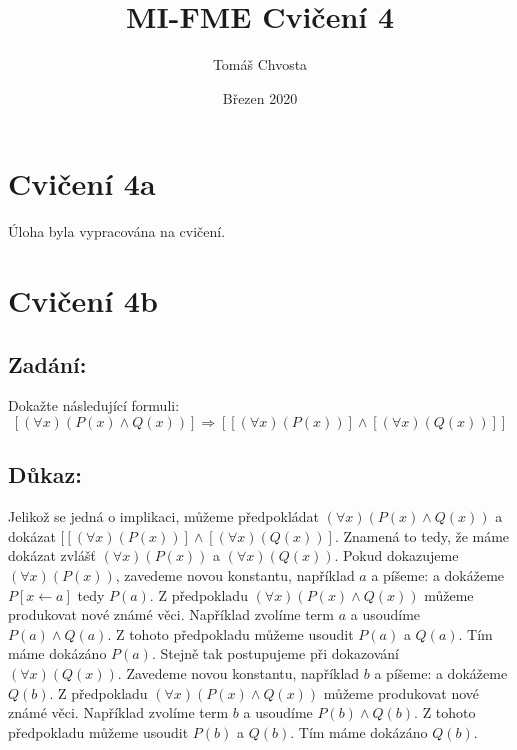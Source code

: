 \documentclass{article}
\title{MI-FME Cvičení 4}
\author{Tomáš Chvosta}
\date{Březen 2020}
\begin{document}
\maketitle

\section{Cvičení 4a}
Úloha byla vypracována na cvičení.

\section{Cvičení 4b}

\subsection{Zadání:}

Dokažte následující formuli:
$$[(\forall x)(P(x) \wedge Q(x))] \Rightarrow [[(\forall x)(P(x))]\wedge [(\forall x)(Q(x))]] $$

\subsection{Důkaz:}
Jelikož se jedná o implikaci, můžeme předpokládat $(\forall x)(P(x) \wedge Q(x))$ a dokázat $[[(\forall x)(P(x))]\wedge [(\forall x)(Q(x))]$. Znamená to tedy, že máme dokázat zvlášť $(\forall x)(P(x))$ a  $(\forall x)(Q(x))$. Pokud dokazujeme $(\forall x)(P(x))$, zavedeme novou konstantu, například $a$ a píšeme:  a dokážeme $P[x\leftarrow a]$ tedy $P(a)$. Z předpokladu $(\forall x)(P(x) \wedge Q(x))$ můžeme produkovat nové známé věci. Například zvolíme term $a$ a usoudíme $P(a) \wedge Q(a)$. Z tohoto předpokladu můžeme usoudit $P(a)$ a $Q(a)$. Tím máme dokázáno $P(a)$. Stejně tak postupujeme při dokazování $(\forall x)(Q(x))$. Zavedeme novou konstantu, například $b$ a píšeme:  a dokážeme $Q(b)$. Z předpokladu $(\forall x)(P(x) \wedge Q(x))$ můžeme produkovat nové známé věci. Například zvolíme term $b$ a usoudíme $P(b) \wedge Q(b)$. Z tohoto předpokladu můžeme usoudit $P(b)$ a $Q(b)$. Tím máme dokázáno $Q(b)$.
\end{document}
